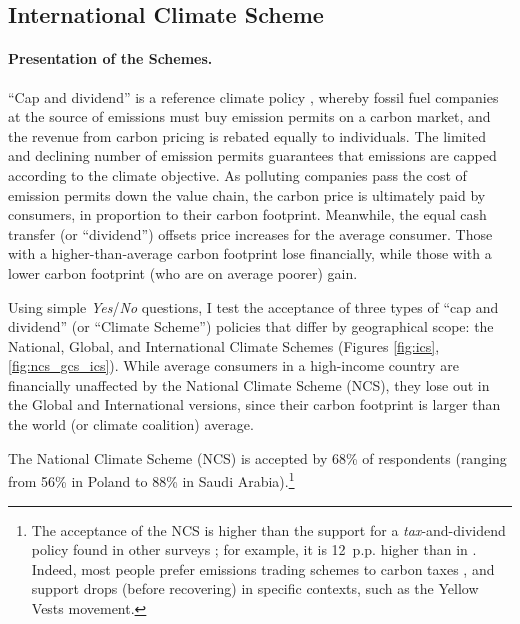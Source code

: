 \documentclass[12pt,english]{article}
\begin{document}
\subsection{International Climate Scheme}\label{subsec:ics}


\paragraph{Presentation of the Schemes.} ``Cap and dividend'' is a reference climate policy \citep{grubb_greenhouse_1990,bertram_tradeable_1992,baer_equity_2000,barnes_creating_2008,blanchard_major_2021}, %
whereby fossil fuel companies at the source of emissions must buy emission permits on a carbon market, and the revenue from carbon pricing is rebated equally to individuals. The limited and declining number of emission permits guarantees that emissions are capped according to the climate objective. As polluting companies pass the cost of emission permits down the value chain, the carbon price is ultimately paid by consumers, in proportion to their carbon footprint. Meanwhile, the equal cash transfer (or ``dividend'') offsets price increases for the average consumer. Those with a higher-than-average carbon footprint lose financially, while those with a lower carbon footprint (who are on average poorer) gain. 

Using simple \textit{Yes}/\textit{No} questions, I test the acceptance of three types of ``cap and dividend'' (or ``Climate Scheme'') policies that differ by geographical scope: the National, Global, and International Climate Schemes (Figures \ref{fig:ics}, \ref{fig:ncs_gcs_ics}). While average consumers in a high-income country are financially unaffected by the National Climate Scheme (NCS), they lose out in the Global and International versions, since their carbon footprint is larger than the world (or climate coalition) average. %

The National Climate Scheme (NCS) 
is accepted by 68\% of respondents (ranging from 56\% in Poland to 88\% in Saudi Arabia).\footnote{The acceptance of the NCS is higher than the support for a \textit{tax}-and-dividend policy found in other surveys \citep{douenne_yellow_2022,mildenberger_limited_2022}; for example, it is 12~p.p. higher than in \cite{dechezlepretre_fighting_2025}. Indeed, most people prefer emissions trading schemes to carbon taxes \citep{funke_prices_2025}, and support drops (before recovering) in specific contexts, such as the Yellow Vests movement.} 
\end{document}
